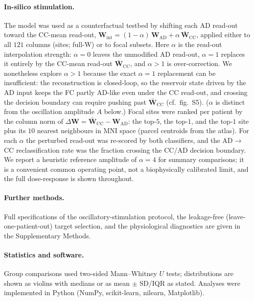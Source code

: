 \documentclass[11pt]{article}
\begin{document}
\paragraph{In-silico stimulation.}
The model was used as a counterfactual testbed by shifting each AD read-out
toward the CC-mean read-out,
$\mathbf{W}_{\mathrm{int}} = (1-\alpha)\,\mathbf{W}_{\mathrm{AD}}
 + \alpha\,\bar{\mathbf{W}}_{\mathrm{CC}}$, applied either to all $121$ columns
(sites; full-W) or to focal subsets. Here $\alpha$ is the read-out interpolation
strength: $\alpha=0$ leaves the unmodified AD read-out, $\alpha=1$ replaces it
entirely by the CC-mean read-out $\bar{\mathbf{W}}_{\mathrm{CC}}$, and $\alpha>1$
is over-correction. We nonetheless explore $\alpha>1$ because the exact $\alpha=1$
replacement can be insufficient: the reconstruction is closed-loop, so the
reservoir state driven by the AD input keeps the FC partly AD-like even under the
CC read-out, and crossing the decision boundary can require pushing past
$\bar{\mathbf{W}}_{\mathrm{CC}}$ (cf.\ fig.~S5). ($\alpha$ is distinct from the
oscillation amplitude $A$ below.) Focal sites were ranked per patient by the
column norm of $\Delta\mathbf{W}=\bar{\mathbf{W}}_{\mathrm{CC}}-
\mathbf{W}_{\mathrm{AD}}$: the top-$5$, the top-$1$, and the top-$1$ site plus
its $10$ nearest neighbours in MNI space (parcel centroids from the atlas). For
each $\alpha$ the perturbed read-out was re-scored by both classifiers, and the
AD$\rightarrow$CC reclassification rate was the fraction crossing the CC/AD
decision boundary. We report a heuristic reference amplitude of $\alpha=4$ for
summary comparisons; it is a convenient common operating point, not a
biophysically calibrated limit, and the full dose-response is shown throughout.

\paragraph{Further methods.}
Full specifications of the oscillatory-stimulation protocol, the
leakage-free (leave-one-patient-out) target selection, and the physiological
diagnostics are given in the Supplementary Methods.

\paragraph{Statistics and software.}
Group comparisons used two-sided Mann--Whitney $U$ tests; distributions are
shown as violins with medians or as mean $\pm$ SD/IQR as stated. Analyses were
implemented in Python (NumPy, scikit-learn, nilearn, Matplotlib).
\end{document}
